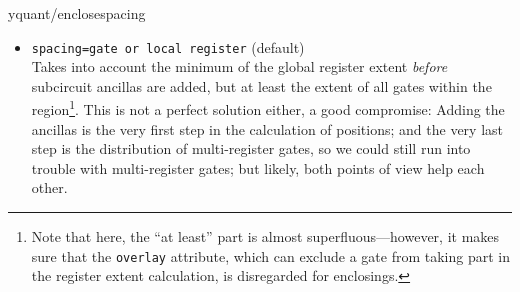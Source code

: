 \documentclass{scrartcl}
\makeatletter
\let\unpatched@minted@inline@iii=\minted@inline@iii%
\def\patched@minted@inline@iii#1{%
      \unpatched@minted@inline@iii{#1}%
      \par%
      \endgroup\egroup\nopagebreak\vskip-\parskip\nopagebreak%
      \noindent\ignorespaces%
   }
\def\patch@mintinline{%
      \let\minted@inline@iii=\patched@minted@inline@iii%
   }
\let\unpatched@RobustMintInlineProcess@ii=\RobustMintInlineProcess@ii
\def\patched@RobustMintInlineProcess@ii#1{%
      \unpatched@RobustMintInlineProcess@ii{#1}%
      \par%
      \endgroup\egroup\nopagebreak\vskip-\parskip\nopagebreak%
      \noindent\ignorespaces%
   }
\def\patch@mintinline{%
      \let\RobustMintInlineProcess@ii=\patched@RobustMintInlineProcess@ii%
   }
\newenvironment{option*}[3][]{\ifhmode\par\fi\addvspace{5mm}%
   \vbox\bgroup\begingroup%
      \patch@mintinline%
      \raggedleft%
      \hspace*{-1cm}%
      \phantomsection\label{yquant:/#2/#3}%
      \texttt{\ifstrempty{#1}\relax{\compat{#1}}\textcolor{gray}{/#2/}\textcolor{mintgreen}{#3}}\hfill default: %
      \tex}{\par\addvspace{5mm}}
\newenvironment{codeexample}{%
   \VerbatimEnvironment%
   \let\FVB@VerbatimOut\minted@FVB@VerbatimOut
   \let\FVE@VerbatimOut\minted@FVE@VerbatimOut
   \minted@configlang{tex}%
   \minted@fvset
   \begin{VerbatimOut}[codes={\catcode`\^^I=12},firstline,lastline]{\minted@jobname.pyg}%
}{
   \end{VerbatimOut}%
   \minted@langlinenoson%
   \savebox\codeexamplebox{ \minted@jobname.pyg}%
   \ifdim\wd\codeexamplebox>\dimexpr.5\linewidth-3mm\relax%
      \wd\codeexamplebox=.5\linewidth%
   \else%
      \wd\codeexamplebox=\dimexpr\wd\codeexamplebox+3mm\relax%
   \fi%
   \noindent\begin{minipage}{\wd\codeexamplebox}%
      \centering%
      \usebox\codeexamplebox%
   \end{minipage}%
   \begin{minipage}{\dimexpr\linewidth-\wd\codeexamplebox\relax}%
      \expandafter\minted@pygmentize\expandafter{\minted@lang}%
   \end{minipage}%
   \minted@langlinenosoff%
   \par%
}
\newenvironment{codeexample*}{%
   \VerbatimEnvironment%
   \let\FVB@VerbatimOut\minted@FVB@VerbatimOut
   \let\FVE@VerbatimOut\minted@FVE@VerbatimOut
   \minted@configlang{tex}%
   \minted@fvset
   \begin{VerbatimOut}[codes={\catcode`\^^I=12},firstline,lastline]{\minted@jobname.pyg}%
}{
   \end{VerbatimOut}%
   \minted@langlinenoson%
   \begin{adjustbox}{center}
       \minted@jobname.pyg %
   \end{adjustbox}\nopagebreak
   \expandafter\minted@pygmentize\expandafter{\minted@lang}%
   \minted@langlinenosoff%
   \par%
}
\def\pkg#1{\textcolor{brown}{\texttt{#1}}}
\def\ttlink{\link\texttt}
\def\Yquant{\pkg{yquant}}
\makeatother
\begin{document}
\begin{option*}{yquant/enclose}{spacing}
\begin{itemize}
                     \vskip-3mm
                     However, this is problematic due to the way subcircuits are handled by \Yquant.
                     If you have a subcircuit which has ancillas, during the calculation of the final positioning, \Yquant{} will accumulate their extents and add it to the closest connected register, so you might suddently end up with a very large enclosing region which you did not expect.
                     \begin{example}
                        \begin{codeexample}
                        \end{codeexample}
                     \end{example}
                  \item {}\texttt{spacing=gate or local register} (default) \\
                     Takes into account the minimum of the global register extent \emph{before} subcircuit ancillas are added, but at least the extent of all gates within the region\footnote{%
                     Note that here, the ``at least'' part is almost superfluous---however, it makes sure that the \ttlink{overlay} attribute, which can exclude a gate from taking part in the register extent calculation, is disregarded for enclosings.
                  }.
                  This is not a perfect solution either, a good compromise: Adding the ancillas is the very first step in the calculation of positions; and the very last step is the distribution of multi\hyp register gates, so we could still run into trouble with multi\hyp register gates; but likely, both points of view help each other.
                  \begin{example}
                     \begin{codeexample*}
\begin{tikzpicture}

\end{tikzpicture}
\end{codeexample*}
\end{example}
\end{itemize}
\end{option*}
\end{document}
